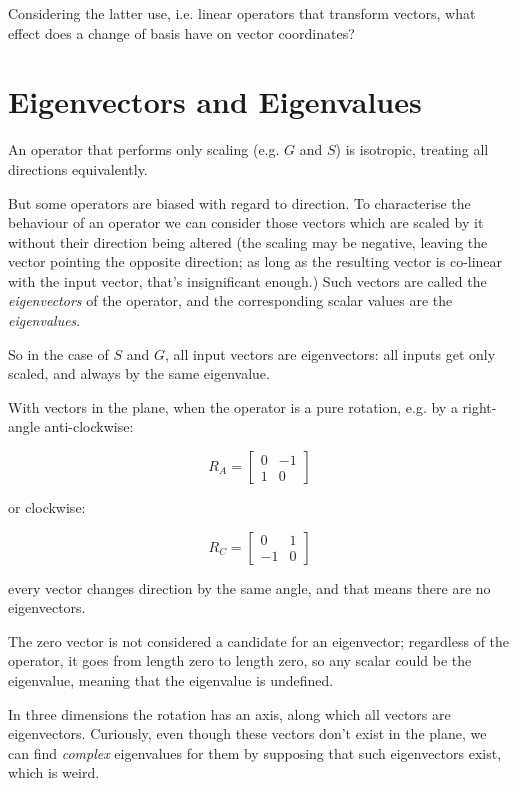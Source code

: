 Considering the latter use, i.e. linear operators that transform vectors, what effect does a change of basis have on vector coordinates?

\section{Eigenvectors and Eigenvalues}\label{sec:vectors-eigen}

An operator that performs only scaling (e.g. $G$ and $S$) is isotropic, treating all directions equivalently.

But some operators are biased with regard to direction. To characterise the behaviour of an operator we can consider those vectors which are scaled by it without their direction being altered (the scaling may be negative, leaving the vector pointing the opposite direction; as long as the resulting vector is co-linear with the input vector, that's insignificant enough.) Such vectors are called the \textit{eigenvectors} of the operator, and the corresponding scalar values are the \textit{eigenvalues}.

So in the case of $S$ and $G$, all input vectors are eigenvectors: all inputs get only scaled, and always by the same eigenvalue.

With vectors in the plane, when the operator is a pure rotation, e.g. by a right-angle anti-clockwise:

$$R_A = \begin{bmatrix}0 & -1 \\ 1 & 0\end{bmatrix}$$

or clockwise:

$$R_C = \begin{bmatrix}0 & 1 \\ -1 & 0\end{bmatrix}$$

every vector changes direction by the same angle, and that means there are no eigenvectors.

The zero vector is not considered a candidate for an eigenvector; regardless of the operator, it goes from length zero to length zero, so any scalar could be the eigenvalue, meaning that the eigenvalue is undefined.

In three dimensions the rotation has an axis, along which all vectors are eigenvectors. Curiously, even though these vectors don't exist in the plane, we can find \textit{complex} eigenvalues for them by supposing that such eigenvectors exist, which is weird.

